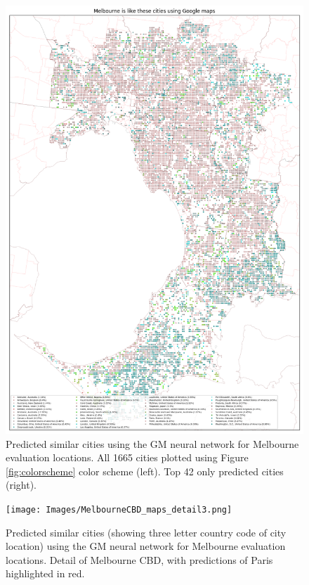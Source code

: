\documentclass[sageh,times]{sagej}
\begin{document}
\begin{figure}[!htbp]
\includegraphics[scale=0.20]{Images/MelbourneOverallAbrev_maps.png} 
\caption{Predicted similar cities using the GM neural network for Melbourne evaluation locations. All 1665 cities plotted using Figure \ref{fig:colorscheme} color scheme (left). Top 42 only predicted cities (right).}    
 \label{fig:melmaps}  
\end{figure} 

\begin{figure}[!htbp]
\centering     
\texttt{[image: Images/MelbourneCBD\_maps\_detail3.png]} 
\caption{Predicted similar cities (showing three letter country code of city location) using the GM neural network for Melbourne evaluation locations. Detail of Melbourne CBD, with predictions of Paris highlighted in red.}    
 \label{fig:melmapscbd}  
\end{figure} 
\end{document}
